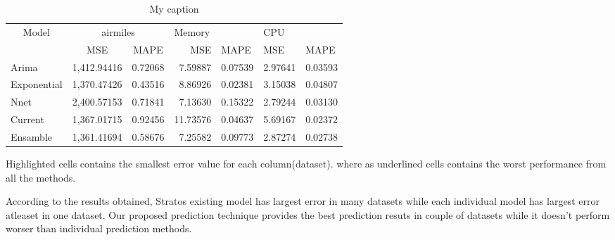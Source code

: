 \begin{table}[]
\centering
\caption{My caption}
\label{my-label}
\begin{tabular}{|l|r|r|r|l|l|l|}
\hline
\multicolumn{1}{|c|}{\multirow{2}{*}{Model}} & \multicolumn{2}{c|}{airmiles}                                   & \multicolumn{2}{l|}{Memory} & \multicolumn{2}{l|}{CPU} \\ \cline{2-7} 
\multicolumn{1}{|c|}{}                       & \multicolumn{1}{c|}{MSE}         & \multicolumn{1}{c|}{MAPE}    & MSE           & MAPE        & MSE         & MAPE       \\ \hline
Arima                                        & 1,412.94416                      & 0.72068                      & 7.59887       & 0.07539     & 2.97641     & 0.03593    \\ \hline
Exponential                                  & 1,370.47426                      & 0.43516                      & 8.86926       & 0.02381     & 3.15038     & 0.04807    \\ \hline
Nnet                                         & 2,400.57153                      & 0.71841                      & 7.13630       & 0.15322     & 2.79244     & 0.03130    \\ \hline
Current                                      & 1,367.01715                      & 0.92456                      & 11.73576      & 0.04637     & 5.69167     & 0.02372    \\ \hline
Ensamble                                     & \multicolumn{1}{l|}{1,361.41694} & \multicolumn{1}{l|}{0.58676} & 7.25582       & 0.09773     & 2.87274     & 0.02738    \\ \hline
\end{tabular}
\end{table}


Highlighted cells contains the smallest error value for each column(dataset). where as underlined cells contains the worst performance from all the methods. 

According to the results obtained, Stratos existing model has largest error in many datasets while each individual model has largest error atleaset in one dataset. Our proposed prediction technique provides the best prediction resuts in couple of datasets while it doesn't perform worser than individual prediction methods. 
